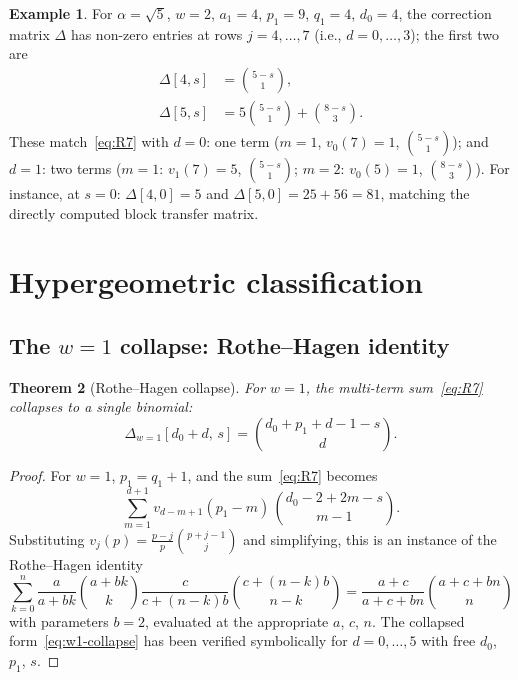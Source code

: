 \documentclass[11pt]{article}
\newtheorem{theorem}{Theorem}[section]
\theoremstyle{definition}
\newtheorem{example}[theorem]{Example}
\theoremstyle{remark}
\begin{document}
\begin{example}\label{ex:sqrt5}
For $\alpha = \sqrt{5}$, $w = 2$, $a_1 = 4$, $p_1 = 9$, $q_1 = 4$,
$d_0 = 4$, the correction matrix $\Delta$ has non-zero entries at
rows $j = 4, \ldots, 7$ (i.e., $d = 0, \ldots, 3$); the first two
are
\begin{align*}
  \Delta[4, s] &= \binom{5 - s}{1},\\
  \Delta[5, s] &= 5\binom{5 - s}{1} + \binom{8 - s}{3}.
\end{align*}
These match~\eqref{eq:R7} with $d = 0$: one term ($m = 1$,
$v_0(7) = 1$, $\binom{5 - s}{1}$); and $d = 1$: two terms
($m = 1$: $v_1(7) = 5$, $\binom{5 - s}{1}$; $m = 2$:
$v_0(5) = 1$, $\binom{8 - s}{3}$).
For instance, at $s = 0$: $\Delta[4, 0] = 5$ and
$\Delta[5, 0] = 25 + 56 = 81$, matching the directly computed
block transfer matrix.
\end{example}

\section{Hypergeometric classification}\label{sec:hypergeom}

\subsection{The $w = 1$ collapse: Rothe--Hagen identity}

\begin{theorem}[Rothe--Hagen collapse]\label{thm:rothe-hagen}
For $w = 1$, the multi-term sum~\eqref{eq:R7} collapses to a
single binomial:
\begin{equation}\label{eq:w1-collapse}
  \Delta_{w=1}[d_0 + d,\, s] = \binom{d_0 + p_1 + d - 1 - s}{d}.
\end{equation}
\end{theorem}

\begin{proof}
For $w = 1$, $p_1 = q_1 + 1$, and the sum~\eqref{eq:R7} becomes
\[
  \sum_{m=1}^{d+1} v_{d-m+1}(p_1 - m)\,\binom{d_0 - 2 + 2m - s}{m-1}.
\]
Substituting $v_j(p) = \frac{p-j}{p}\binom{p+j-1}{j}$ and
simplifying, this is an instance of the Rothe--Hagen identity
\cite{Rothe1793, Hagen1891}
\[
  \sum_{k=0}^{n} \frac{a}{a+bk}\binom{a+bk}{k}
  \frac{c}{c+(n-k)b}\binom{c+(n-k)b}{n-k}
  = \frac{a+c}{a+c+bn}\binom{a+c+bn}{n}
\]
with parameters $b = 2$, evaluated at the appropriate $a$, $c$,
$n$.
The collapsed form~\eqref{eq:w1-collapse} has been verified
symbolically for $d = 0, \ldots, 5$ with free $d_0$, $p_1$, $s$.
\end{proof}
\end{document}
